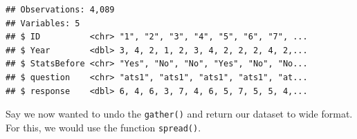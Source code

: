 \documentclass[12pt,]{book}
\newenvironment{Shaded}{\begin{snugshade}}{\end{snugshade}}
\newcommand{\CommentTok}[1]{\textcolor[rgb]{0.56,0.35,0.01}{\textit{#1}}}
\newcommand{\DataTypeTok}[1]{\textcolor[rgb]{0.13,0.29,0.53}{#1}}
\newcommand{\DecValTok}[1]{\textcolor[rgb]{0.00,0.00,0.81}{#1}}
\newcommand{\KeywordTok}[1]{\textcolor[rgb]{0.13,0.29,0.53}{\textbf{#1}}}
\newcommand{\NormalTok}[1]{#1}
\newcommand{\OperatorTok}[1]{\textcolor[rgb]{0.81,0.36,0.00}{\textbf{#1}}}
\newcommand{\StringTok}[1]{\textcolor[rgb]{0.31,0.60,0.02}{#1}}
\begin{document}
\begin{verbatim}
## Observations: 4,089
## Variables: 5
## $ ID          <chr> "1", "2", "3", "4", "5", "6", "7", ...
## $ Year        <dbl> 3, 4, 2, 1, 2, 3, 4, 2, 2, 2, 4, 2,...
## $ StatsBefore <chr> "Yes", "No", "No", "Yes", "No", "No...
## $ question    <chr> "ats1", "ats1", "ats1", "ats1", "at...
## $ response    <dbl> 6, 4, 6, 3, 7, 4, 6, 5, 7, 5, 5, 4,...
\end{verbatim}

Say we now wanted to undo the \texttt{gather()} and return our dataset to wide format. For this, we would use the function \texttt{spread()}.

\begin{Shaded}
\end{Shaded}
\end{document}
